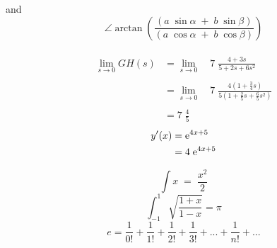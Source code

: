 and \\
\[\angle \arctan(\frac{(a \; \sin \alpha \; + \; b \; \sin \beta)}{(a \; \cos \alpha \; + \; b \; \cos \beta)})\] \\
\begin{align*}
	\lim_{s \to 0}{GH(s)} & = \lim_{s \to 0} \quad 7 \; \frac{4+3s}{5+2s+6s^2} \\ \\
	& = \lim_{s \to 0} \quad 7 \; \frac{4(1+\frac{3}{4}s)}{5(1+\frac{2}{5}s+\frac{6}{5}s^2)} \\ \\
	& = 7 \; \frac{4}{5}
\end{align*}
\begin{align*}
	y'(x) &= \mathrm{e}^{4x+5} \\
	&= 4 \; \mathrm{e}^{4x+5}
\end{align*}
\emptyline

\newpage

\newpage
\[\int x \; = \; \frac{x^2}{2}\]
\[\int_{-1}^{1}\sqrt{\frac{1+x}{1-x}}=\pi\]
\[e=\frac{1}{0!}+\frac{1}{1!}+\frac{1}{2!}+\frac{1}{3!}+...+\frac{1}{n!}+...\]
\newpage

